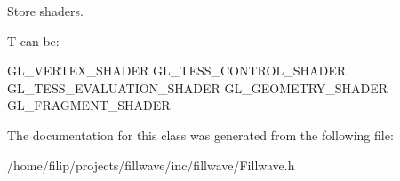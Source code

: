 Store shaders.

T can be\+:

G\+L\+\_\+\+V\+E\+R\+T\+E\+X\+\_\+\+S\+H\+A\+D\+ER G\+L\+\_\+\+T\+E\+S\+S\+\_\+\+C\+O\+N\+T\+R\+O\+L\+\_\+\+S\+H\+A\+D\+ER G\+L\+\_\+\+T\+E\+S\+S\+\_\+\+E\+V\+A\+L\+U\+A\+T\+I\+O\+N\+\_\+\+S\+H\+A\+D\+ER G\+L\+\_\+\+G\+E\+O\+M\+E\+T\+R\+Y\+\_\+\+S\+H\+A\+D\+ER G\+L\+\_\+\+F\+R\+A\+G\+M\+E\+N\+T\+\_\+\+S\+H\+A\+D\+ER 

The documentation for this class was generated from the following file\+:\begin{DoxyCompactItemize}
\item 
/home/filip/projects/fillwave/inc/fillwave/Fillwave.\+h\end{DoxyCompactItemize}
